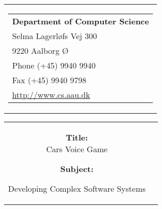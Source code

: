 \thispagestyle{empty}
\begin{titlepage}
\begin{nopagebreak}
{\samepage 
\begin{tabular}{r}
	\parbox{16cm}{
	\hfill \parbox{7cm}{\begin{tabular}{l}
		{\small \textbf{Department of Computer Science}}\\
		{\small Selma Lagerløfs Vej 300} \\
		{\small 9220 Aalborg Ø} \\
		{\small Phone (+45) 9940 9940} \\
		{\small Fax (+45) 9940 9798} \\
		{\small \url{http://www.cs.aau.dk}}
	\end{tabular}}
	}
\end{tabular}

\begin{tabular}{cc}
	\parbox{8cm}{
	\begin{description}
		\item { \textbf{Title:}}\\ 
			Cars Voice Game
    		\item { \textbf{Subject:}}\\ 
			\raggedright Developing Complex Software Systems
	\end{description}
	
}
\end{tabular}}
\end{nopagebreak}
\end{titlepage}
